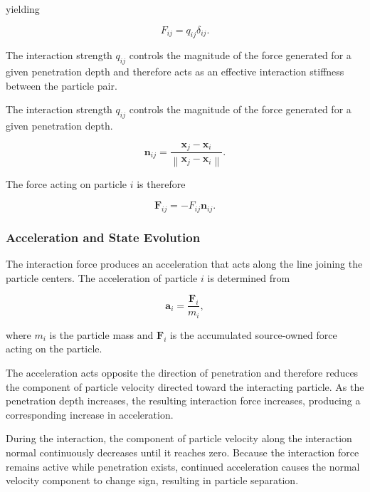 yielding

\begin{equation}
F_{ij}
=
q_{ij}\delta_{ij}.
\end{equation}

The interaction strength $q_{ij}$ controls the
magnitude of the force generated for a given
penetration depth and therefore acts as an effective
interaction stiffness between the particle pair.

The interaction strength $q_{ij}$ controls the
magnitude of the force generated for a given
penetration depth.

\begin{equation}
\mathbf{n}_{ij}
=
\frac{\mathbf{x}_j-\mathbf{x}_i}
     {\left\|
      \mathbf{x}_j-\mathbf{x}_i
      \right\|}.
\end{equation}

The force acting on particle $i$ is therefore

\begin{equation}
\mathbf{F}_{ij}
=
-F_{ij}\mathbf{n}_{ij}.
\end{equation}

\subsubsection{Acceleration and State Evolution}

The interaction force produces an acceleration that
acts along the line joining the particle centers.
The acceleration of particle $i$ is determined from

\begin{equation}
\mathbf{a}_i
=
\frac{\mathbf{F}_i}{m_i},
\end{equation}

where $m_i$ is the particle mass and
$\mathbf{F}_i$ is the accumulated source-owned force
acting on the particle.

The acceleration acts opposite the direction of
penetration and therefore reduces the component of
particle velocity directed toward the interacting
particle. As the penetration depth increases, the
resulting interaction force increases, producing a
corresponding increase in acceleration.

During the interaction, the component of particle
velocity along the interaction normal continuously
decreases until it reaches zero. Because the
interaction force remains active while penetration
exists, continued acceleration causes the normal
velocity component to change sign, resulting in
particle separation.

